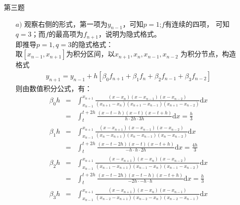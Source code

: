 \documentclass[12pt,a4paper,utf8]{ctexart}
\begin{document}
\begin{enumerate}
\begin{enumerate}
  \end{enumerate}


\item[第三题]
      \begin{enumerate}
        \item[$a)$] 观察右侧的形式，第一项为$y_{n-1}$，可知$p=1$;$f$有连续的四项，
                    可知$q=3$；而$f$的最高项为$f_{n+1}$，说明为隐式格式。\\
                        即推导$p=1,q=3$的隐式格式：\\
                        取$[x_{n-1},x_{n+1}]$为积分区间，以${x_{n+1},x_{n},x_{n-1},x_{n-2}}$
                    为积分节点，构造格式
                    \begin{eqnarray} 
                        y_{n+1}=y_{n-1}+h[\beta_0f_{n+1}+\beta_1f_{n}+\beta_2f_{n-1}+\beta_3f_{n-2}]
                    \end{eqnarray}
                    则由数值积分公式，有：
                    \begin{eqnarray} 
                        \beta_0h &=& \int_{x_{n-1}}^{x_{n+1}} 
                                    \frac{(x-x_{n})(x-x_{n-1})(x-x_{n-2})}{(x_{n+1}-x_n)(x_{n+1}-x_{n-1})(x_{n+1}-x_{n-2})} \mathrm{d}x \\
                                &=& \int_{t}^{t+2h} 
                                    \frac{(x-t-h)(x-t)(x-t+h)}{h\cdot 2h\cdot 3h} \mathrm{d}x  =  \frac{h}{3}  \nonumber\\ 
                        \beta_1h &=& \int_{x_{n-1}}^{x_{n+1}} 
                                    \frac{(x-x_{n+1})(x-x_{n-1})(x-x_{n-2})}{(x_{n}-x_{n+1})(x_{n}-x_{n-1})(x_{n}-x_{n-2})} \mathrm{d}x \\
                                &=& \int_{t}^{t+2h} 
                                    \frac{(x-t-2h)(x-t)(x-t+h)}{-h\cdot h\cdot 2h} \mathrm{d}x  =  \frac{4h}{3}  \nonumber\\ 
                        \beta_2h &=& \int_{x_{n-1}}^{x_{n+1}} 
                                    \frac{(x-x_{n+1})(x-x_{n})(x-x_{n-2})}{(x_{n-1}-x_{n+1})(x_{n-1}-x_{n})(x_{n-1}-x_{n-2})} \mathrm{d}x \\
                                &=& \int_{t}^{t+2h} 
                                    \frac{(x-t-2h)(x-t-h)(x-t+h)}{-2h\cdot -h\cdot h} \mathrm{d}x  =  \frac{h}{3}  \nonumber\\
                        \beta_3h &=& \int_{x_{n-1}}^{x_{n+1}} 
                                    \frac{(x-x_{n+1})(x-x_{n})(x-x_{n-1})}{(x_{n-2}-x_{n+1})(x_{n-2}-x_{n})(x_{n-2}-x_{n-1})} \mathrm{d}x \\

\end{eqnarray}
\end{enumerate}
\end{enumerate}
\end{document}
